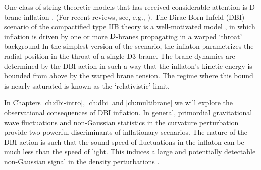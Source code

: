 One class of string-theoretic models that has received 
considerable attention is D-brane inflation
\cite{brane1,brane2,brane3,brane4,brane5,
brane6,brane7,brane8,brane9,brane10,brane11,brane12,brane13,
brane14,brane15,brane16,brane17,Brodie:2003qv,Vikman:2006hk, 
Mukhanov:2005bu,Kallosh:2007wm,brane18,
brane19,brane20,brane21}. 
(For recent reviews, see, e.g., \cite{tyereview,cline,McAllister:2007bg,Lorenz:2007ze,
Bean:2007eh,bean}). 
The Dirac-Born-Infeld (DBI) scenario 
of the compactified type IIB theory is a well-motivated model \cite{brane6,brane11}, 
in which inflation is driven by one or more ${\rm D}$-branes 
propagating in a warped `throat' background 
% 
In the simplest version of the scenario, 
the inflaton parametrizes the radial 
position in the throat of a single ${\rm D3}$-brane. 
The brane dynamics are determined by the DBI action in such a 
way that the inflaton's kinetic energy is bounded from above by the warped 
brane tension. The regime where this bound is nearly saturated is 
known as the `relativistic' limit.






In Chapters \ref{ch:dbi-intro}, \ref{ch:dbi} and \ref{ch:multibrane} we will 
explore the observational consequences of DBI inflation. 
In general, primordial gravitational wave fluctuations
and non-Gaussian statistics in the curvature perturbation provide 
two powerful discriminants of inflationary scenarios. 
The nature of the DBI action is such that the sound 
speed of fluctuations in the inflaton can be much less than the speed of 
light. This induces a large and potentially detectable non-Gaussian 
signal in the density perturbations \cite{brane6,brane11,lidser3,chenetal}. 


